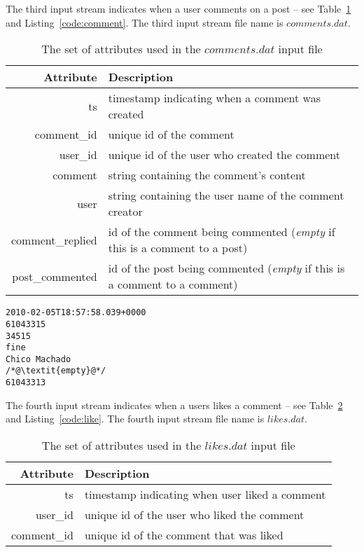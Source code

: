 \documentclass{sig-alternate}
\begin{document}
The third input stream indicates when a user comments on a post -- see Table~\ref{table:comment} and Listing~\ref{code:comment}. The third input stream file name is $comments.dat$.

\begin{table}[ht]
	\caption{The set of attributes used in the $comments.dat$ input file}
	\centering 
	\begin{tabular}{r p{5.2cm}}
		\toprule
		Attribute		&	 Description\\
		\midrule
		ts			&	timestamp indicating when a comment was created\\[2ex]
		comment\_id	&	unique id of the comment\\[2ex]
		user\_id	&	unique id of the user who created the comment\\[2ex]		
		comment		& 	string containing the comment's content\\[2ex]		
		user		&   string containing the user name of the comment creator\\[2ex]
		comment\_replied		&   id of the comment being commented (\textit{empty} if this is a comment to a post)\\[2ex]
		post\_commented		&   id of the post being commented (\textit{empty} if this is a comment to a comment)\\[2ex]
		\bottomrule 
	\end{tabular}
	\label{table:comment}
\end{table}

\lstset{}
\begin{lstlisting}[float=ht,caption={First line from the $comments.dat$ file -- one attribute per line of listing},label={code:comment}]
2010-02-05T18:57:58.039+0000
61043315
34515
fine
Chico Machado
/*@\textit{empty}@*/
61043313
\end{lstlisting}

The fourth input stream indicates when a users likes a comment -- see Table~\ref{table:like} and Listing~\ref{code:like}. The fourth input stream file name is $likes.dat$.

\begin{table}[ht]
	\caption{The set of attributes used in the $likes.dat$ input file}
	\centering 
	\begin{tabular}{r p{5.2cm}}
		\toprule
		Attribute		&	 Description\\
		\midrule
		ts			&	timestamp indicating when user liked a comment\\[2ex]
		user\_id	&	unique id of the user who liked the comment\\[2ex]		
		comment\_id	& 	unique id of the comment that was liked\\[2ex]		
		\bottomrule 
	\end{tabular}
	\label{table:like}
\end{table}
\end{document}
